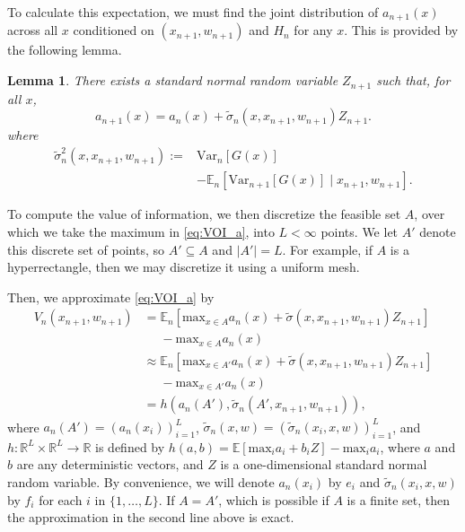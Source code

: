 \documentclass{article}
\newcommand{\w}{w}
\newcommand{\sigmatilde}{\tilde{\sigma}}
\newtheorem{lemma}{Lemma}
\begin{document}
To calculate this expectation, we must find the joint distribution of $a_{n+1}\left(x\right)$ across all $x$ conditioned on $\left(x_{n+1},\w_{n+1}\right)$ and $H_{n}$ for any $x$. 
This is provided by the following lemma.
\begin{lemma}
There exists a standard normal random variable $Z_{n+1}$ such that, for all $x$,\\
\begin{equation*}
    a_{n+1}\left(x\right) =  a_{n}\left(x\right)+\sigmatilde_n(x,x_{n+1},\w_{n+1})Z_{n+1}.
\end{equation*}
where 
\begin{align*}
\sigmatilde^2_n(x,x_{n+1},\w_{n+1}) :=& \mbox{Var}_{n}\left[G\left(x\right)\right]\\
&-\mathbb{E}_{n}\left[\mbox{Var}_{n+1}\left[G\left(x\right)\right]\mid x_{n+1},\w_{n+1}\right].
\end{align*}
\end{lemma}

To compute the value of information, we then discretize the feasible set $A$, over which we take the maximum in \eqref{eq:VOI_a}, into $L<\infty$ points.  We let $A'$ denote this discrete set of points, so $A' \subseteq A$ and $|A'|=L$. For example, if $A$ is a hyperrectangle, then we may discretize it using a uniform mesh.

Then, we approximate \eqref{eq:VOI_a} by
\begin{align*}
V_n(x_{n+1},\w_{n+1}) 
&= \mathbb{E}_{n}\left[\mbox{max}_{x\in A} a_{n}\left(x\right) + \sigmatilde(x, x_{n+1},\w_{n+1})Z_{n+1}\right]\\
  &\phantom{{}=}-\mbox{max}_{x \in A} a_{n}\left(x\right)\\
&\approx \mathbb{E}_{n}\left[\mbox{max}_{x\in A'} a_{n}\left(x\right) + \sigmatilde(x, x_{n+1},\w_{n+1})Z_{n+1}\right]\\
&\phantom{{}\approx}-\mbox{max}_{x \in A'} a_{n}\left(x\right)\\
&=h(a_n(A'),\sigmatilde_n(A',x_{n+1},\w_{n+1})),
\end{align*}
where 
$a_{n}(A')=\left(a_{n}\left(x_{i}\right)\right)_{i=1}^{L}$,
$\tilde{\sigma}_{n}\left(x,\w\right)=\left(\tilde{\sigma}_{n}\left(x_{i},x,\w\right)\right)_{i=1}^{L}$, and 
$h:\mathbb{R}^{L}\times\mathbb{R}^{L}\rightarrow\mathbb{R}$ is defined
by $h\left(a,b\right)=\mathbb{E}\left[\mbox{max}_{i}a_{i}+b_{i}Z\right]-\mbox{max}_{i}a_{i}$,
where $a$ and $b$ are any deterministic vectors, and $Z$ is a one-dimensional
standard normal random variable. By convenience, we will denote $a_{n}\left(x_{i}\right)$ by $e_{i}$ and 
$\tilde{\sigma}_{n}\left(x_{i},x,\w\right)$ by $f_{i}$ for each $i$ in $\{1,\ldots,L\}$.
If $A = A'$, which is possible if $A$ is a finite set, then the approximation in the second line above is exact.
\end{document}
